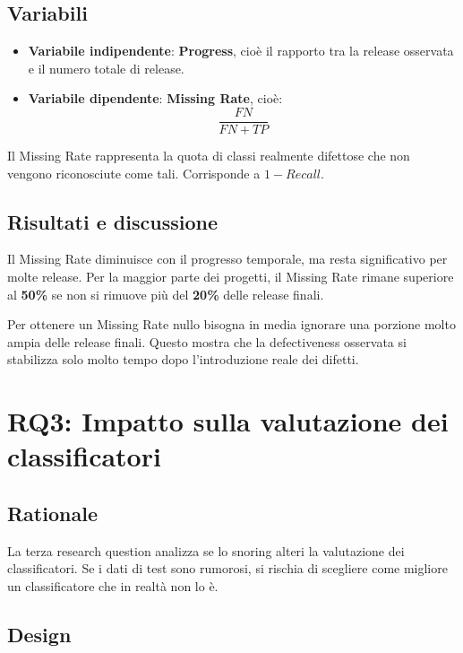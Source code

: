 \subsection{Variabili}

\begin{itemize}
    \item \textbf{Variabile indipendente}: \textbf{Progress}, cioè il rapporto tra la release osservata e il numero totale di release.
    \item \textbf{Variabile dipendente}: \textbf{Missing Rate}, cioè:
    \[
        \frac{FN}{FN + TP}
    \]
\end{itemize}

Il Missing Rate rappresenta la quota di classi realmente difettose che non vengono riconosciute come tali. Corrisponde a \(1 - Recall\).

\subsection{Risultati e discussione}

Il Missing Rate diminuisce con il progresso temporale, ma resta significativo per molte release. Per la maggior parte dei progetti, il Missing Rate rimane superiore al \textbf{50\%} se non si rimuove più del \textbf{20\%} delle release finali.

\begin{notaprof}
Per ottenere un Missing Rate nullo bisogna in media ignorare una porzione molto ampia delle release finali. Questo mostra che la defectiveness osservata si stabilizza solo molto tempo dopo l'introduzione reale dei difetti.
\end{notaprof}

\section{RQ3: Impatto sulla valutazione dei classificatori}

\subsection{Rationale}

La terza research question analizza se lo snoring alteri la valutazione dei classificatori. Se i dati di test sono rumorosi, si rischia di scegliere come migliore un classificatore che in realtà non lo è.

\subsection{Design}

